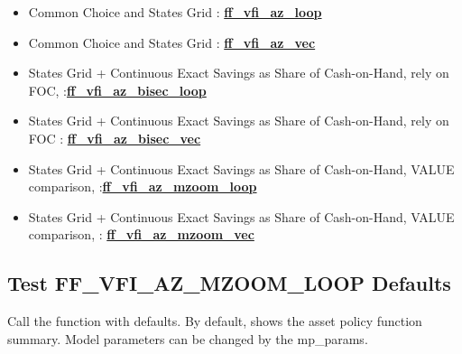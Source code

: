 \documentclass[
]{book}
\begin{document}
\begin{itemize}
\item
  Common Choice and States Grid :
  \href{https://github.com/FanWangEcon/MEconTools/blob/master/MEconTools/vfi/ff_vfi_az_loop.m}{\textbf{ff\_vfi\_az\_loop}}
\item
  Common Choice and States Grid :
  \href{https://github.com/FanWangEcon/MEconTools/blob/master/MEconTools/vfi/ff_vfi_az_vec.m}{\textbf{ff\_vfi\_az\_vec}}
\item
  States Grid + Continuous Exact Savings as Share of Cash-on-Hand,
  rely on FOC, :\href{https://github.com/FanWangEcon/MEconTools/blob/master/MEconTools/vfi/ff_vfi_az_bisec_loop.m}{\textbf{ff\_vfi\_az\_bisec\_loop}}
\item
  States Grid + Continuous Exact Savings as Share of Cash-on-Hand,
  rely on FOC :
  \href{https://github.com/FanWangEcon/MEconTools/blob/master/MEconTools/vfi/ff_vfi_az_bisec_vec.m}{\textbf{ff\_vfi\_az\_bisec\_vec}}
\item
  States Grid + Continuous Exact Savings as Share of Cash-on-Hand,
  VALUE comparison, :\href{https://github.com/FanWangEcon/MEconTools/blob/master/MEconTools/vfi/ff_vfi_az_mzoom_loop.m}{\textbf{ff\_vfi\_az\_mzoom\_loop}}
\item
  States Grid + Continuous Exact Savings as Share of Cash-on-Hand,
  VALUE comparison, :
  \href{https://github.com/FanWangEcon/MEconTools/blob/master/MEconTools/vfi/ff_vfi_az_mzoom_vec.m}{\textbf{ff\_vfi\_az\_mzoom\_vec}}
\end{itemize}

\hypertarget{test-ff_vfi_az_mzoom_loop-defaults}{%
\subsection{Test FF\_VFI\_AZ\_MZOOM\_LOOP Defaults}\label{test-ff_vfi_az_mzoom_loop-defaults}}

Call the function with defaults. By default, shows the asset policy
function summary. Model parameters can be changed by the mp\_params.
\end{document}
